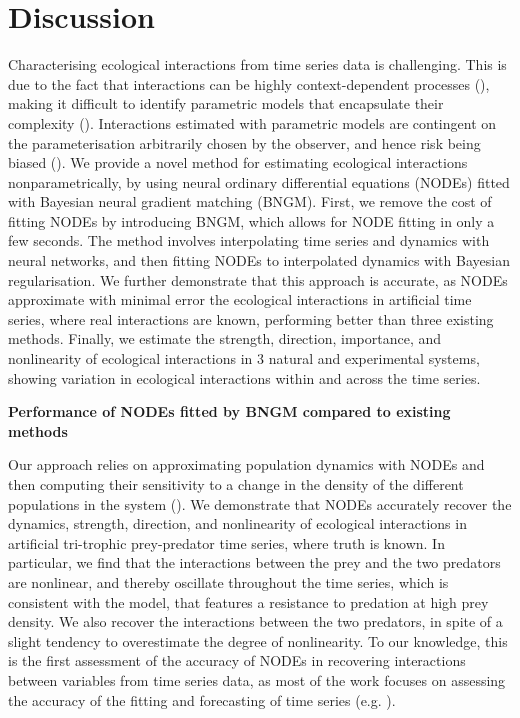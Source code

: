 \documentclass[11pt, oneside]{article}
\begin{document}
\section{Discussion}

Characterising ecological interactions from time series data is challenging.
This is due to the fact that interactions can be highly context-dependent processes (\cite{Song2021}), making it difficult to identify parametric models that encapsulate their complexity (\cite{Wood2001}).
Interactions estimated with parametric models are contingent on the parameterisation arbitrarily chosen by the observer, and hence risk being biased (\cite{Wood2001,Adamson2013}).
We provide a novel method for estimating ecological interactions nonparametrically, by using neural ordinary differential equations (NODEs) fitted with Bayesian neural gradient matching (BNGM). 
First, we remove the cost of fitting NODEs by introducing BNGM, which allows for NODE fitting in only a few seconds. 
The method involves interpolating time series and dynamics with neural networks, and then fitting NODEs to interpolated dynamics with Bayesian regularisation.
We further demonstrate that this approach is accurate, as NODEs approximate with minimal error the ecological interactions in artificial time series, where real interactions are known, performing better than three existing methods. 
Finally, we estimate the strength, direction, importance, and nonlinearity of ecological interactions in 3 natural and experimental systems, showing variation in ecological interactions within and across the time series.

\textbf{Performance of NODEs fitted by BNGM compared to existing methods}

Our approach relies on approximating population dynamics with NODEs and then computing their sensitivity to a change in the density of the different populations in the system (\cite{Bonnaffe2021a}). 
We demonstrate that NODEs accurately recover the dynamics, strength, direction, and nonlinearity of ecological interactions in artificial tri-trophic prey-predator time series, where truth is known.
In particular, we find that the interactions between the prey and the two predators are nonlinear, and thereby oscillate throughout the time series, which is consistent with the model, that features a resistance to predation at high prey density.
We also recover the interactions between the two predators, in spite of a slight tendency to overestimate the degree of nonlinearity.
To our knowledge, this is the first assessment of the accuracy of NODEs in recovering interactions between variables from time series data, as most of the work focuses on assessing the accuracy of the fitting and forecasting of time series (e.g. \cite{Mai2016,Chen2018,Treven2021,Frank2022}).
\end{document}
